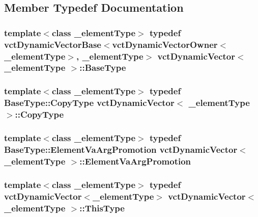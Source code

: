 \subsection{Member Typedef Documentation}
\hypertarget{classvct_dynamic_vector_aab0ea4a1ec16f7694beb39869ab780bf}{
\subsubsection[{Base\-Type}]{\setlength{\rightskip}{0pt plus 5cm}template$<$class \-\_\-element\-Type$>$ typedef {\bf vct\-Dynamic\-Vector\-Base}$<${\bf vct\-Dynamic\-Vector\-Owner}$<$\-\_\-element\-Type$>$, \-\_\-element\-Type$>$ {\bf vct\-Dynamic\-Vector}$<$ \-\_\-element\-Type $>$\-::{\bf Base\-Type}}}\label{classvct_dynamic_vector_aab0ea4a1ec16f7694beb39869ab780bf}
\hypertarget{classvct_dynamic_vector_a924a58839df36234b070c7d06f875079}{
\subsubsection[{Copy\-Type}]{\setlength{\rightskip}{0pt plus 5cm}template$<$class \-\_\-element\-Type$>$ typedef {\bf Base\-Type\-::\-Copy\-Type} {\bf vct\-Dynamic\-Vector}$<$ \-\_\-element\-Type $>$\-::{\bf Copy\-Type}}}\label{classvct_dynamic_vector_a924a58839df36234b070c7d06f875079}
\hypertarget{classvct_dynamic_vector_a7f290da80b23d4dd6bcc61d7db77aa75}{
\subsubsection[{Element\-Va\-Arg\-Promotion}]{\setlength{\rightskip}{0pt plus 5cm}template$<$class \-\_\-element\-Type$>$ typedef {\bf Base\-Type\-::\-Element\-Va\-Arg\-Promotion} {\bf vct\-Dynamic\-Vector}$<$ \-\_\-element\-Type $>$\-::{\bf Element\-Va\-Arg\-Promotion}}}\label{classvct_dynamic_vector_a7f290da80b23d4dd6bcc61d7db77aa75}
\hypertarget{classvct_dynamic_vector_a35327e01975af9fc9db8d93a4a27370f}{
\subsubsection[{This\-Type}]{\setlength{\rightskip}{0pt plus 5cm}template$<$class \-\_\-element\-Type$>$ typedef {\bf vct\-Dynamic\-Vector}$<$\-\_\-element\-Type$>$ {\bf vct\-Dynamic\-Vector}$<$ \-\_\-element\-Type $>$\-::{\bf This\-Type}}}\label{classvct_dynamic_vector_a35327e01975af9fc9db8d93a4a27370f}
